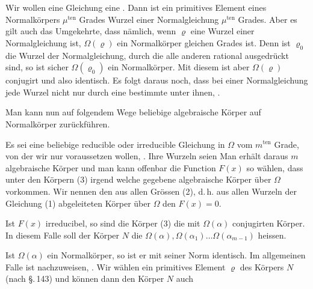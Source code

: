 
Wir wollen eine Gleichung eine . Dann ist ein primitives Element eines Normalkörpers $\mu^{\mathrm{ten}}$ Grades Wurzel einer Normalgleichung $\mu^{\mathrm{ten}}$ Grades. Aber es gilt auch das Umgekehrte, dass nämlich, wenn $\varrho$ eine Wurzel einer Normalgleichung ist, $\Omega(\varrho)$ ein Normalkörper gleichen Grades ist. Denn ist $\varrho_0$ die Wurzel der Normalgleichung, durch die alle anderen rational ausgedrückt sind, so ist sicher $\Omega(\varrho_0)$ ein Normalkörper. Mit diesem ist aber $\Omega(\varrho)$ conjugirt und also identisch. Es folgt daraus noch, dass bei einer Normalgleichung jede Wurzel nicht nur durch eine bestimmte unter ihnen, .

Man kann nun auf folgendem Wege beliebige algebraische Körper auf Normalkörper zurückführen.

Es sei
eine beliebige reducible oder irreducible Gleichung in $\Omega$ vom $m^{\mathrm{ten}}$ Grade, von der wir nur voraussetzen wollen, . Ihre Wurzeln seien
Man erhält daraus $m$ algebraische Körper
und man kann offenbar die Function $F(x)$ so wählen, dass unter den Körpern (3) irgend welche gegebene algebraische Körper über $\Omega$ vorkommen. Wir nennen den aus allen Grössen (2), d.\,h. aus allen Wurzeln der Gleichung (1) abgeleiteten Körper über $\Omega$
den  $F(x) = 0$.

Ist $F(x)$ irreducibel, so sind die Körper (3) die mit $\Omega(\alpha)$ conjugirten Körper. In diesem Falle soll der Körper $N$ die  $\Omega(\alpha), \Omega(\alpha_1) \ldots \Omega(\alpha_{m-1})$ heissen.

Ist $\Omega(\alpha)$ ein Normalkörper, so ist er mit seiner Norm identisch. Im allgemeinen Falle ist nachzuweisen, . Wir wählen ein primitives Element $\varrho$ des Körpers $N$ (nach \S.\,143) und können dann den Körper $N$ auch
